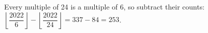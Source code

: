 Every multiple of 24 is a multiple of 6, so subtract their counts: $\left\lfloor\dfrac{2022}{6}\right\rfloor-\left\lfloor\dfrac{2022}{24}\right\rfloor=337-84=\boxed{253}$.
